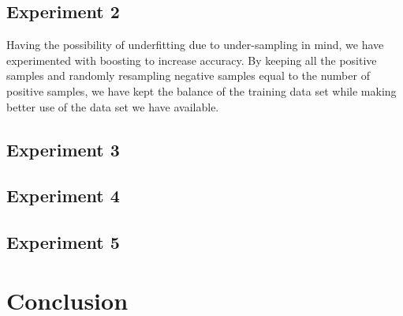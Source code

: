\documentclass[10pt]{article}
\begin{document}
\subsection{Experiment 2}
Having the possibility of underfitting due to under-sampling in mind, we
have experimented with boosting to increase accuracy. By keeping all the
positive samples and randomly resampling negative samples equal to the
number of positive samples, we have kept the balance of the training data
set while making better use of the data set we have available.
\subsection{Experiment 3}

\subsection{Experiment 4}
\subsection{Experiment 5}

\section{Conclusion}
\end{document}
